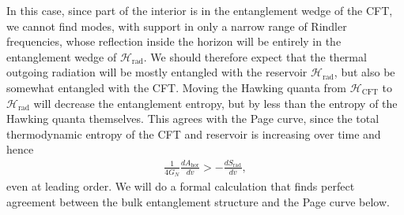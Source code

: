 \documentclass[11pt,a4paper]{article}
\newcommand{\Srad}{S_\text{rad} }
\begin{document}
In this case, since part of the interior is in the entanglement wedge of the CFT, we cannot find modes, with support in only a narrow range of Rindler frequencies, whose reflection inside the horizon will be entirely in the entanglement wedge of $\mathcal{H}_\text{rad}$. We should therefore expect that the thermal outgoing radiation will be mostly entangled with the reservoir $\mathcal{H}_\text{rad}$, but also be somewhat entangled with the CFT. Moving the Hawking quanta from $\mathcal{H}_\text{CFT}$ to $\mathcal{H}_\text{rad}$ will decrease the entanglement entropy, but by less than the entropy of the Hawking quanta themselves. This agrees with the Page curve, since the total thermodynamic entropy of the CFT and reservoir is increasing over time and hence
\begin{align}
\frac{1}{4G_N}\frac{d A_\text{hor}}{dv} > - \frac{d \Srad}{dv},
\end{align}
even at leading order. We will do a formal calculation that finds perfect agreement between the bulk entanglement structure and the Page curve below.
\end{document}
